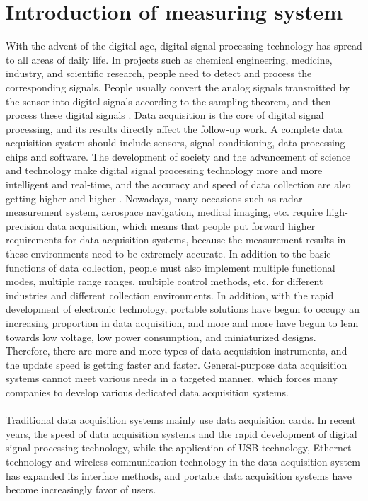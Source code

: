 \section{Introduction of measuring system}
\label{Introduction of measuring system}
With the advent of the digital age, digital signal processing technology has spread to all areas of daily life. In projects such as chemical engineering, medicine, industry, and scientific research, people need to detect and process the corresponding signals. People usually convert the analog signals transmitted by the sensor into digital signals according to the sampling theorem, and then process these digital signals \cite{oppenheim1978applications}. Data acquisition is the core of digital signal processing, and its results directly affect the follow-up work. A complete data acquisition system should include sensors, signal conditioning, data processing chips and software. The development of society and the advancement of science and technology make digital signal processing technology more and more intelligent and real-time, and the accuracy and speed of data collection are also getting higher and higher \cite{zhang2013design}. Nowadays, many occasions such as radar measurement system, aerospace navigation, medical imaging, etc. require high-precision data acquisition, which means that people put forward higher requirements for data acquisition systems, because the measurement results in these environments need to be extremely accurate. In addition to the basic functions of data collection, people must also implement multiple functional modes, multiple range ranges, multiple control methods, etc. for different industries and different collection environments. In addition, with the rapid development of electronic technology, portable solutions have begun to occupy an increasing proportion in data acquisition, and more and more have begun to lean towards low voltage, low power consumption, and miniaturized designs. Therefore, there are more and more types of data acquisition instruments, and the update speed is getting faster and faster. General-purpose data acquisition systems cannot meet various needs in a targeted manner, which forces many companies to develop various dedicated data acquisition systems.
\\
\\
Traditional data acquisition systems mainly use data acquisition cards. In recent years, the speed of data acquisition systems and the rapid development of digital signal processing technology, while the application of USB technology, Ethernet technology and wireless communication technology in the data acquisition system has expanded its interface methods, and portable data acquisition systems have become increasingly favor of users.
